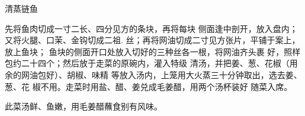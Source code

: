 \begin{recipe}{清蒸链鱼}

\ingredients


\cooking

\step 先将鱼肉切成一寸二长、四分见方的条块，再将每块 侧面逢中剖开，放入盘内；又将火腿、口茉、金钩切成二祖. 丝；再将网油切成二寸见方张片，平铺于案上，放上鱼块； 鱼块的侧面开口处放入切好的三种丝各一根，将网油齐头裹 好，照样包约二十四个；然后放于走菜的原碗内，灌入特级 清汤，并把姜、葱、花椒（用余的网油包好）、胡椒、味精 等放入汤内，上笼用大火蒸三十分钟取出，选去姜、葱、花 椒不用。走菜时用盐、醋、姜兑成毛姜醋，用两个汤杯装好 随菜入席。

\notes

此菜汤鲜、鱼嫩，用毛姜醋蘸食别有风味。

\end{recipe}

